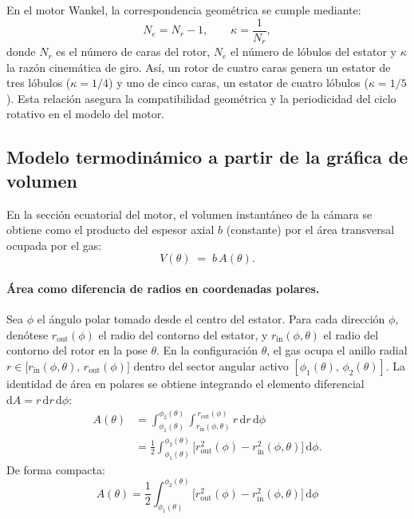 \documentclass{LS}
\begin{document}
En el motor Wankel, la correspondencia geométrica se cumple mediante:
\[
N_e = N_r - 1, \qquad \kappa = \frac{1}{N_r},
\]
donde \(N_r\) es el número de caras del rotor, \(N_e\) el número de lóbulos del estator y \(\kappa\) la razón cinemática de giro. Así, un rotor de cuatro caras genera un estator de tres lóbulos (\(\kappa = 1/4\)) y uno de cinco caras, un estator de cuatro lóbulos (\(\kappa = 1/5\)). Esta relación asegura la compatibilidad geométrica y la periodicidad del ciclo rotativo en el modelo del motor.


\subsection{Modelo termodinámico a partir de la gráfica de volumen}

En la sección ecuatorial del motor, el volumen instantáneo de la cámara se obtiene como el producto del espesor axial \(b\) (constante) por el área transversal ocupada por el gas:
\begin{equation}
V(\theta) \;=\; b\,A(\theta).
\label{eq:V=Ab}
\end{equation}

\paragraph{Área como diferencia de radios en coordenadas polares.}
Sea \(\phi\) el ángulo polar tomado desde el centro del estator. Para cada dirección \(\phi\), denótese \(r_{\text{out}}(\phi)\) el radio del contorno del estator, y \(r_{\text{in}}(\phi,\theta)\) el radio del contorno del rotor en la pose \(\theta\). En la configuración \(\theta\), el gas ocupa el anillo radial
\(r\in\big[r_{\text{in}}(\phi,\theta),\,r_{\text{out}}(\phi)\big]\) dentro del sector angular activo \([\phi_1(\theta),\,\phi_2(\theta)]\).
La identidad de área en polares se obtiene integrando el elemento diferencial \(\mathrm{d}A = r\,\mathrm{d}r\,\mathrm{d}\phi\):
\begin{equation}
\begin{aligned}
A(\theta)
&= \int_{\phi_1(\theta)}^{\phi_2(\theta)}
\int_{r_{\text{in}}(\phi,\theta)}^{\,r_{\text{out}}(\phi)}
r\,\mathrm{d}r\,\mathrm{d}\phi
\\[2pt]
&= \frac{1}{2}\int_{\phi_1(\theta)}^{\phi_2(\theta)}
\Big[r_{\text{out}}^2(\phi)-r_{\text{in}}^2(\phi,\theta)\Big]\,\mathrm{d}\phi.
\end{aligned}
\label{eq:area-polares}
\end{equation}
De forma compacta:
\begin{equation}
A(\theta)
= \frac{1}{2}\int_{\phi_1(\theta)}^{\phi_2(\theta)}
\Big[r_{\text{out}}^2(\phi)-r_{\text{in}}^2(\phi,\theta)\Big]\,
\mathrm{d}\phi
\label{eq:area-polar-cont}
\end{equation}
\end{document}

